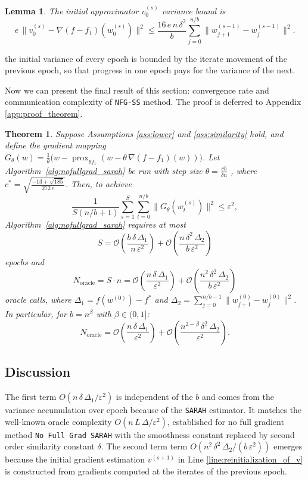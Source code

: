 \documentclass{article}
\DeclareMathOperator{\prox}{prox}
\newtheorem{theorem}{Theorem}
\newtheorem{lemma}{Lemma}
\begin{document}
\begin{lemma}%
\label{lem:initial_deviation_gradient}
The initial approximator $v_0^{(s)}$ variance bound is
\[ 
    e\,\|v_0^{(s)} - \nabla(f - f_1)(w_0^{(s)})\|^2 
    \leq \frac{16\,e\,n\,\delta^2}{b}\sum_{j=0}^{n/b}
    \|w_{j+1}^{(s-1)} - w_j^{(s-1)}\|^2.
\]
\end{lemma}

the initial variance of every epoch is bounded by the iterate movement of 
the previous epoch, so that progress in one epoch pays for the 
variance of the next.

Now we can present the final result of this section: convergence rate and
communication complexity of \texttt{NFG-SS} method. The proof is deferred to Appendix \ref{app:proof_theorem}. 

\begin{theorem}
\label{thm:convergence}
Suppose Assumptions \ref{ass:lower}
and \ref{ass:similarity} hold, and define the gradient mapping \\
$
    G_\theta(w) = \frac{1}{\theta}\Big(w - \prox_{\theta f_1} \left(w - \theta \, \nabla(f - f_1)(w) \right)\Big)
$.
Let Algorithm~\ref{alg:nofullgrad_sarah} be run 
with step size $\theta = \frac{cb}{\delta n}$ 
, where 
$c^* = \sqrt{\frac{-13+\sqrt{185}}{272\,e}}$.
Then, to achieve
\[
\frac{1}{S(n/b+1)}\sum_{s=1}^{S}\sum_{t=0}^{n/b}
\|G_\theta(w_t^{(s)})\|^2 \leq \varepsilon^2,
\]
Algorithm~\ref{alg:nofullgrad_sarah} requires at most
\[
S = \mathcal{O}\!\left(\frac{b\,\delta\,\Delta_1}
{n\,\varepsilon^2}\right) 
+ \mathcal{O}\!\left(\frac{n\,\delta^2\,\Delta_2}
{b\,\varepsilon^2}\right)
\]
epochs and
\[
N_{\text{oracle}} = S \cdot n 
= \mathcal{O}\!\left(\frac{n\,\delta\,\Delta_1}{\varepsilon^2}\right) 
+ \mathcal{O}\!\left(\frac{n^2\,\delta^2\,\Delta_2}
{b\,\varepsilon^2}\right)
\]
oracle calls, where 
$\Delta_1 = f(w^{(0)}) - f^*$ and 
$\Delta_2 = \sum_{j=0}^{n/b-1}
\|w_{j+1}^{(0)} - w_j^{(0)}\|^2$.
In particular, for $b = n^\beta$ with 
$\beta \in (0, 1]$:
\[
N_{\text{oracle}} 
= \mathcal{O}\!\left(\frac{n\,\delta\,\Delta_1}{\varepsilon^2}\right) 
+ \mathcal{O}\!\left(\frac{n^{2-\beta}\,\delta^2\,\Delta_2}
{\varepsilon^2}\right).
\]
\end{theorem}

\subsection{Discussion}

The first term $O(n\,\delta\,\Delta_1/\varepsilon^2)$ is independent of the $b$ and comes from the variance accumulation over epoch because of the \texttt{SARAH} estimator. It matches the well-known oracle complexity $O(n\,L\,\Delta/\varepsilon^2)$, established for no full gradient method \texttt{No Full Grad SARAH} \cite{medyakov2025variance} with the smoothness constant replaced by second order similarity constant $\delta$. The second term 
term $O(n^2\,\delta^2\,\Delta_2/(b\,\varepsilon^2))$ emerges because the initial gradient estimation $v^{(s+1)}$ in Line \ref{line:reinitialization_of_v} is constructed from gradients computed at the iterates of the previous epoch. 
\end{document}

